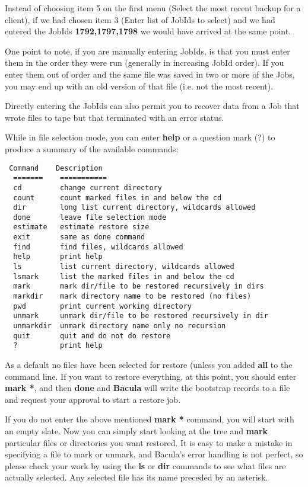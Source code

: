 Instead of choosing item 5 on the first menu (Select the most recent backup
for a client), if we had chosen item 3 (Enter list of JobIds to select) and we
had entered the JobIds {\bf 1792,1797,1798} we would have arrived at the same
point.                 

One point to note, if you are manually entering JobIds, is that you must enter
them in the order they were run (generally in increasing JobId order). If you
enter them out of order and the same file was saved in two or more of the
Jobs, you may end up with an old version of that file (i.e. not the most
recent). 

Directly entering the JobIds can also permit you to recover data from
a Job that wrote files to tape but that terminated with an error status.

While in file selection mode, you can enter {\bf help} or a question mark (?)
to produce a summary of the available commands:  

\footnotesize
\begin{verbatim}
 Command    Description
  =======    ===========
  cd         change current directory
  count      count marked files in and below the cd
  dir        long list current directory, wildcards allowed
  done       leave file selection mode
  estimate   estimate restore size
  exit       same as done command
  find       find files, wildcards allowed
  help       print help
  ls         list current directory, wildcards allowed
  lsmark     list the marked files in and below the cd
  mark       mark dir/file to be restored recursively in dirs
  markdir    mark directory name to be restored (no files)
  pwd        print current working directory
  unmark     unmark dir/file to be restored recursively in dir
  unmarkdir  unmark directory name only no recursion
  quit       quit and do not do restore
  ?          print help
\end{verbatim}
\normalsize

As a default no files have been selected for restore (unless you
added {\bf all} to the command line. If you want to restore
everything, at this point, you should enter {\bf mark *}, and then {\bf done}
and {\bf Bacula} will write the bootstrap records to a file and request your
approval to start a restore job. 

If you do not enter the above mentioned {\bf mark *} command, you will start
with an empty slate. Now you can simply start looking at the tree and {\bf
mark} particular files or directories you want restored. It is easy to make
a mistake in specifying a file to mark or unmark, and Bacula's error handling
is not perfect, so please check your work by using the {\bf ls} or {\bf dir}
commands to see what files are actually selected. Any selected file has its
name preceded by an asterisk. 

